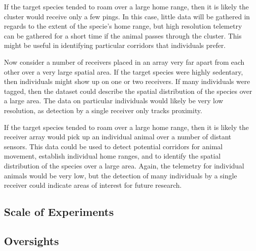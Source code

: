 If the target species tended to roam over a large home range, then it is likely the cluster would receive only a few pings.  In this case, little data will be gathered in regards to the extent of the specie's home range, but high resolution telemetry can be gathered for a short time if the animal passes through the cluster.  This might be useful in identifying particular corridors that individuals prefer.

Now consider a number of receivers placed in an array very far apart from each other over a very large spatial area.
If the target species were highly sedentary, then individuals might show up on one or two receivers.  If many individuals were tagged, then the dataset could describe the spatial distribution of the species over a large area.  The data on particular individuals would likely be very low resolution, as detection by a single receiver only tracks proximity.  

If the target species tended to roam over a large home range, then it is likely the receiver array would pick up an individual animal over a number of distant sensors.  This data could be used to detect potential corridors for animal movement, establish individual home ranges, and to identify the spatial distribution of the species over a large area.  Again, the telemetry for individual animals would be very low, but the detection of many individuals by a single receiver could indicate areas of interest for future research.


\subsection{Scale of Experiments}


\subsection{Oversights}


